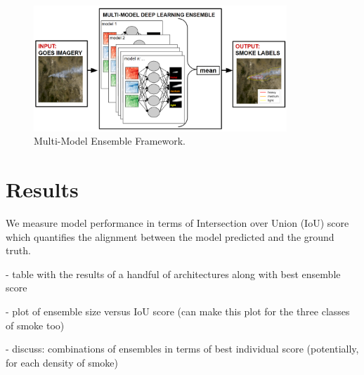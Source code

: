 \documentclass{article}
\begin{document}
\begin{figure}[h]
    \centering
    \includegraphics[width=0.85\textwidth]{ensemble_framework.png}
    \caption{Multi-Model Ensemble Framework.}
    \label{fig:ensemble_framework}
\end{figure}


\section{Results}
We measure model performance in terms of Intersection over Union (IoU) score which quantifies the alignment between the model predicted and the ground truth. 

- table with the results of a handful of architectures along with best ensemble score 

- plot of ensemble size versus IoU score (can make this plot for the three classes of smoke too)

- discuss: combinations of ensembles in terms of best individual score (potentially, for each density of smoke)
\end{document}
